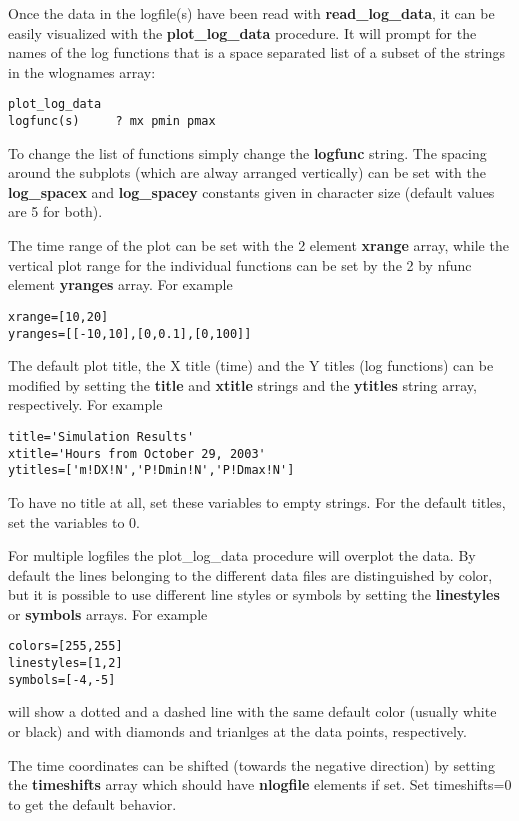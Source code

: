 \documentclass{article}
\begin{document}
Once the data in the logfile(s) have been read with {\bf read\_log\_data},
it can be easily visualized with the {\bf plot\_log\_data} procedure.
It will prompt for the names of the log functions that is
a space separated list of a subset of the strings in the wlognames array:
\begin{verbatim}
plot_log_data
logfunc(s)     ? mx pmin pmax
\end{verbatim}
To change the list of functions simply change the {\bf logfunc} string.
The spacing around the subplots (which are alway arranged vertically)
can be set with the {\bf log\_spacex} and {\bf log\_spacey} constants
given in character size (default values are 5 for both).

The time range of the plot can be set with the 2 element
{\bf xrange} array, while the vertical plot range for the individual functions 
can be set by the 2 by nfunc element {\bf yranges} array. For example
\begin{verbatim}
xrange=[10,20]
yranges=[[-10,10],[0,0.1],[0,100]]
\end{verbatim}
The default plot title, the X title (time) and the Y titles (log functions)
can be modified by setting the {\bf title} and {\bf xtitle} strings
and the {\bf ytitles} string array, respectively. For example
\begin{verbatim}
title='Simulation Results'
xtitle='Hours from October 29, 2003'
ytitles=['m!DX!N','P!Dmin!N','P!Dmax!N']
\end{verbatim}
To have no title at all, set these variables to empty strings.
For the default titles, set the variables to 0.

For multiple logfiles the plot\_log\_data procedure will overplot the data.
By default the lines belonging to the different data files are distinguished
by color, but it is possible to use different line styles or symbols
by setting the {\bf linestyles} or {\bf symbols} arrays. For example
\begin{verbatim}
colors=[255,255]
linestyles=[1,2]
symbols=[-4,-5]
\end{verbatim}
will show a dotted and a dashed line with the same default color
(usually white or black) and with diamonds and trianlges at
the data points, respectively.

The time coordinates can be shifted 
(towards the negative direction) by setting the {\bf timeshifts}
array which should have {\bf nlogfile} elements if set.
Set timeshifts=0 to get the default behavior.
\end{document}
